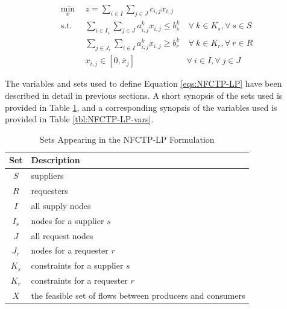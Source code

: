 \begin{subequations}\label{eqs:NFCTP-LP}
  \begin{align}
    \min_{x} \:\: 
    & 
    z = \sum_{i \in I}\sum_{j \in J}c_{i,j} x_{i,j} 
    & 
    \label{eqs:NFCTP-LP_obj} \\
    \text{s.t.} \:\: 
    &
    \sum_{i \in I_s} \sum_{j \in J} a^k_{i,j} x_{i,j} \leq b^k_s 
    &
    \: 
    \forall \: k \in K_s, 
    \forall \: s \in S 
    \label{eqs:NFCTP-LP_sup} \\
    &
    \sum_{j \in J_r} \sum_{i \in I} a^k_{i,j} x_{i,j} \geq b^k_r 
    &
    \: 
    \forall \: k \in K_r,  
    \forall \: r \in R 
    \label{eqs:NFCTP-LP_req} \\
    &
    x_{i,j} \in [0, \tilde{x_j}]
    &
    \forall \: i \in I, 
    \forall \: j \in J 
    \label{eqs:NFCTP-LP_x}
  \end{align}
\end{subequations}

The variables and sets used to define Equation \ref{eqs:NFCTP-LP} have been
described in detail in previous sections. A short synopsis of the sets used is
provided in Table \ref{tbl:NFCTP-LP-sets}, and a corresponding synopsis of the
variables used is provided in Table \ref{tbl:NFCTP-LP-vars}.

\begin{table} [h!]
\centering
\begin{tabularx}{\columnwidth-10pt}{|c|X|} %
\hline
Set         & Description \\
\hline
$S$     & suppliers \\
$R$     & requesters \\
$I$     & all supply nodes \\
$I_s$   & nodes for a supplier $s$ \\
$J$     & all request nodes \\
$J_r$   & nodes for a requester $r$ \\
$K_s$   & constraints for a supplier $s$ \\
$K_r$   & constraints for a requester $r$ \\
$X$         & the feasible set of flows between producers and consumers  \\
\hline
\end{tabularx}
\caption{Sets Appearing in the NFCTP-LP Formulation}
\label{tbl:NFCTP-LP-sets}
\end{table}

